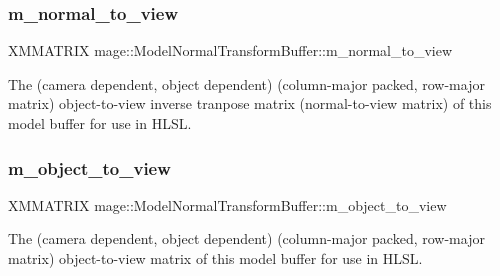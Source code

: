\subsubsection{\texorpdfstring{m\+\_\+normal\+\_\+to\+\_\+view}{m\_normal\_to\_view}}
{\footnotesize\ttfamily X\+M\+M\+A\+T\+R\+IX mage\+::\+Model\+Normal\+Transform\+Buffer\+::m\+\_\+normal\+\_\+to\+\_\+view}

The (camera dependent, object dependent) (column-\/major packed, row-\/major matrix) object-\/to-\/view inverse tranpose matrix (normal-\/to-\/view matrix) of this model buffer for use in H\+L\+SL. \hypertarget{structmage_1_1_model_normal_transform_buffer_afd0823b56d399f56245a5e652b25e6d5}{}\label{structmage_1_1_model_normal_transform_buffer_afd0823b56d399f56245a5e652b25e6d5} 
\subsubsection{\texorpdfstring{m\+\_\+object\+\_\+to\+\_\+view}{m\_object\_to\_view}}
{\footnotesize\ttfamily X\+M\+M\+A\+T\+R\+IX mage\+::\+Model\+Normal\+Transform\+Buffer\+::m\+\_\+object\+\_\+to\+\_\+view}

The (camera dependent, object dependent) (column-\/major packed, row-\/major matrix) object-\/to-\/view matrix of this model buffer for use in H\+L\+SL. 